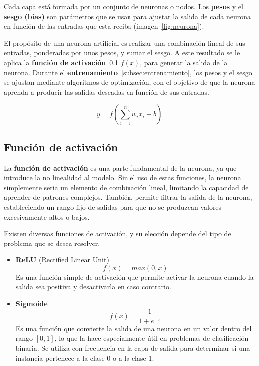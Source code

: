 
Cada capa está formada por un conjunto de neuronas o nodos. Los \textbf{pesos} y el \textbf{sesgo (bias)} son parámetros que se usan para ajustar la salida de cada neurona en función de las entradas que esta reciba (imagen~\ref{fig:neurona}).


El propósito de una neurona artificial es realizar una combinación lineal de sus entradas, ponderadas por unos pesos, y sumar el sesgo. A este resultado se le aplica la \textbf{función de activación}~\ref{subsec:funcion_activacion} \(f(x)\), para generar la salida de la neurona. Durante el \textbf{entrenamiento}~\ref{subsec:entrenamiento}, los pesos y el sesgo se ajustan mediante algoritmos de optimización, con el objetivo de que la neurona aprenda a producir las salidas deseadas en función de sus entradas.

\[y=f(\sum_{i=1}^{n}{w_ix_i + b})\]

\subsection{Función de activación}
\label{subsec:funcion_activacion}
La \textbf{función de activación} es una parte fundamental de la neurona, ya que introduce la no linealidad al modelo. Sin el uso de estas funciones, la neurona simplemente seria un elemento de combinación lineal, limitando la capacidad de aprender de patrones complejos. También, permite filtrar la salida de la neurona, estableciendo un rango fijo de salidas para que no se produzcan valores excesivamente altos o bajos.

Existen diversas funciones de activación, y su elección depende del tipo de problema que se desea resolver.
\begin{itemize}
    \item \textbf{ReLU} (Rectified Linear Unit)
        \[f(x)=max(0, x)\]
        Es una función simple de activación que permite activar la neurona cuando la salida sea positiva y desactivarla en caso contrario.
    \item \textbf{Sigmoide}
        \[f(x)=\frac{1}{1 + e^{-x}}\]
        Es una función que convierte la salida de una neurona en un valor dentro del rango \([0,1]\), lo que la hace especialmente útil en problemas de clasificación binaria. Se utiliza con frecuencia en la capa de salida para determinar si una instancia pertenece a la clase 0 o a la clase 1.
\end{itemize}

